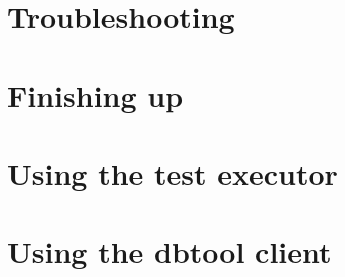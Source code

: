\section{Troubleshooting}


\clearpage

\section{Finishing up}


\clearpage

\section{Using the test executor}


\section{Using the dbtool client}
\label{DBTool}


